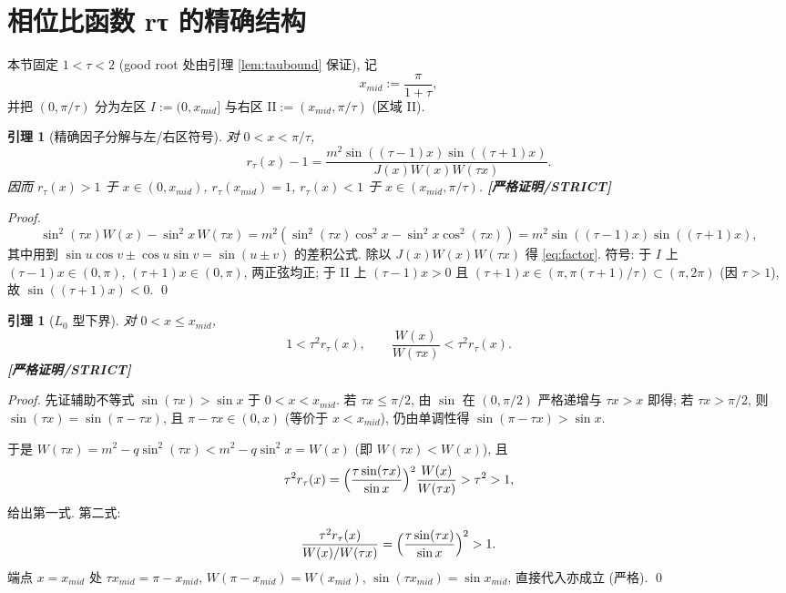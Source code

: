 \documentclass[UTF8]{ctexart}
\newtheorem{lemma}[theorem]{引理}
\newcommand{\STRICT}{\textbf{[严格证明/STRICT]}}
\begin{document}
\section{相位比函数 rτ 的精确结构}\label{sec:structure}

本节固定 $1<\tau<2$ (good root 处由引理 \ref{lem:taubound} 保证), 记
\begin{equation}
	x_{mid}:=\frac\pi{1+\tau},
\end{equation}
并把 $(0,\pi/\tau)$ 分为左区 $I:=(0,x_{mid}]$ 与右区
$\mathrm{II}:=(x_{mid},\pi/\tau)$ (区域 II).

\begin{lemma}[精确因子分解与左/右区符号]\label{lem:factor}
	对 $0<x<\pi/\tau$,
	\begin{equation}
		r_\tau(x)-1
		=\frac{m^2\sin((\tau-1)x)\sin((\tau+1)x)}{J(x)W(x)W(\tau x)}.
		\label{eq:factor}
	\end{equation}
	因而 $r_\tau(x)>1$ 于 $x\in(0,x_{mid})$, $r_\tau(x_{mid})=1$,
	$r_\tau(x)<1$ 于 $x\in(x_{mid},\pi/\tau)$. \STRICT{}
\end{lemma}

\begin{proof}
	\begin{equation}
		\sin^2(\tau x)W(x)-\sin^2x\,W(\tau x)
		=m^2(\sin^2(\tau x)\cos^2x-\sin^2x\cos^2(\tau x))
		=m^2\sin((\tau-1)x)\sin((\tau+1)x),
	\end{equation}
	其中用到 $\sin u\cos v\pm\cos u\sin v=\sin(u\pm v)$ 的差积公式. 除以
	$J(x)W(x)W(\tau x)$ 得 \eqref{eq:factor}. 符号: 于 $I$ 上
	$(\tau-1)x\in(0,\pi)$, $(\tau+1)x\in(0,\pi)$, 两正弦均正; 于 II 上
	$(\tau-1)x>0$ 且 $(\tau+1)x\in(\pi,\pi(\tau+1)/\tau)\subset(\pi,2\pi)$
	(因 $\tau>1$), 故 $\sin((\tau+1)x)<0$. \qed
\end{proof}

\begin{lemma}[$L_0$ 型下界]\label{lem:L0}
	对 $0<x\le x_{mid}$,
	\begin{equation}
		1<\tau^2r_\tau(x),\qquad
		\frac{W(x)}{W(\tau x)}<\tau^2r_\tau(x).
		\label{eq:L0}
	\end{equation}
	\STRICT{}
\end{lemma}

\begin{proof}
	先证辅助不等式 $\sin(\tau x)>\sin x$ 于 $0<x<x_{mid}$. 若 $\tau x\le\pi/2$,
	由 $\sin$ 在 $(0,\pi/2)$ 严格递增与 $\tau x>x$ 即得; 若 $\tau x>\pi/2$, 则
	$\sin(\tau x)=\sin(\pi-\tau x)$, 且 $\pi-\tau x\in(0,x)$ (等价于 $x<x_{mid}$),
	仍由单调性得 $\sin(\pi-\tau x)>\sin x$.

	于是 $W(\tau x)=m^2-q\sin^2(\tau x)<m^2-q\sin^2x=W(x)$ (即
	$W(\tau x)<W(x)$), 且
	\begin{equation}
		\tau^2r_\tau(x)=\Bigl(\frac{\tau\sin(\tau x)}{\sin x}\Bigr)^2
		\frac{W(x)}{W(\tau x)}>\tau^2>1,
	\end{equation}
	给出第一式. 第二式:
	\begin{equation}
		\frac{\tau^2r_\tau(x)}{W(x)/W(\tau x)}
		=\Bigl(\frac{\tau\sin(\tau x)}{\sin x}\Bigr)^2>1.
	\end{equation}
	端点 $x=x_{mid}$ 处 $\tau x_{mid}=\pi-x_{mid}$, $W(\pi-x_{mid})=W(x_{mid})$,
	$\sin(\tau x_{mid})=\sin x_{mid}$, 直接代入亦成立 (严格). \qed
\end{proof}
\end{document}
